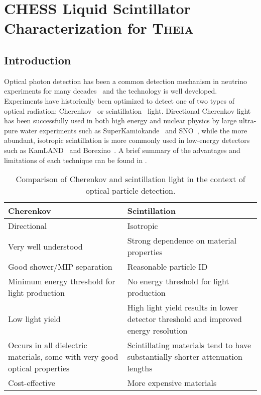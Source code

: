 \chapter{CHESS Liquid Scintillator Characterization for \textsc{Theia}}
\label{ch:wbls}

\section{Introduction}

Optical photon detection has been a common detection mechanism in neutrino experiments for many decades~\cite{imb,superk,sno,kamland,borexino,lsnd} and the technology is well developed.
Experiments have historically been optimized to detect one of two types of optical radiation: Cherenkov~\cite{cherenkov} or scintillation~\cite{birks} light.  
Directional Cherenkov light has been successfully used in both high energy and nuclear physics by large ultra-pure water experiments such as SuperKamiokande~\cite{superk} and SNO~\cite{sno}, while the more abundant, isotropic scintillation is more commonly used in low-energy detectors such as KamLAND~\cite{kamland} and Borexino~\cite{borexino}.  
A brief summary of the advantages and limitations of each technique can be found in .

\begin{table}[]
\begin{tabularx}{\textwidth}{CC}
Cherenkov & Scintillation \\
\hline
\hline
Directional & Isotropic\\
\hline
Very well understood  & Strong dependence on material properties  \\
\hline
Good shower/MIP separation & Reasonable particle ID  \\
\hline
Minimum energy threshold for light production & No energy threshold for light production  \\
\hline
Low light yield & High light yield results in lower detector threshold and improved energy resolution \\
\hline
Occurs in all dielectric materials, some with very good optical properties & Scintillating materials tend to have substantially shorter attenuation lengths  \\
\hline
Cost-effective & More expensive materials \\
\end{tabularx}
\caption{Comparison of Cherenkov and scintillation light in the context of optical particle detection.}
\label{tab:chervsscint}
\end{table}

